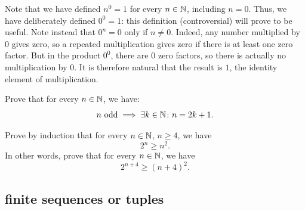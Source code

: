 Note that we have defined $n^0=1$ for every $n\in {\mathbb N}$,
including $n=0$. 
Thus, we have deliberately defined $0^0=1$:
this definition (controversial) will prove to be useful.
Note instead that $0^n=0$ only if $n\neq 0$.
Indeed, any number multiplied by $0$ gives zero, 
so a repeated multiplication gives zero 
if there is at least one zero factor. 
But in the product $0^0$, there are $0$ zero factors, so there is actually no 
multiplication by $0$. 
It is therefore natural that the result is $1$, 
the identity element of multiplication.

\begin{exercise}
  Prove that for every $n\in {\mathbb N}$, we have:
  \[
    n \text{ odd} \implies \exists k\in {\mathbb N}\colon n=2k+1.
  \]
\end{exercise}
  
\begin{exercise}
  Prove by induction that for every $n\in {\mathbb N}$, $n\ge 4$, we have 
  \[  
    2^n \ge n^2.
  \]
  In other words, prove that for every $n\in {\mathbb N}$, we have 
  \[
    2^{n+4} \ge (n+4)^2.  
  \]
  \end{exercise}
  
\subsection{finite sequences or tuples}
%
%

